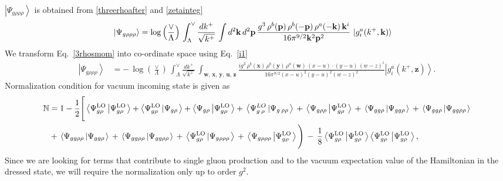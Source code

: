\documentclass[aps,prd,amsmath,amssymb,nofootinbib]{revtex4-2}
\def\mf#1{\mathbb{#1}}
\numberwithin{equation}{section}
\begin{document}
$\left|\Psi_{g\rho\rho\rho}\right\rangle$ is obtained from \eqref{threerhoafter} and \eqref{zetainteg}
\begin{align}\label{3rhosmom}
    \left|\Psi_{g\rho\rho\rho}\right\rangle & = \log{\left(\frac{\vee}{\Lambda}\right)}\,\int_{\Lambda}^{\vee}\frac{dk^{+}}{\sqrt{k^{+}}}\,\int d^{2}\mathbf{k}\, d^{2}\mathbf{p}\,\frac{g^{3}\,\rho^{b}(\mathbf{p})\,\rho^{b}(-\mathbf{p})\,\rho^{a}(-\mathbf{k})\, \mathbf{k}^{i}}{16\pi^{9/2}\mathbf{k}^{2}\mathbf{p}^{2}}\, \ket{g^{a}_{i}(k^{+},\mathbf{k})}
\end{align}
We transform Eq.~\eqref{3rhosmom} into co-ordinate space using Eq.~\eqref{i1}
\begin{align}\label{3rhospos}
 \left|\Psi_{g\rho\rho\rho}\right\rangle & =  -\,\log{\left(\frac{\vee}{\Lambda}\right)}\,\int_{\Lambda}^{\vee}\frac{dk^{+}}{\sqrt{k^{+}}}\,\int_{\mathbf{w},\, \mathbf{x},\, \mathbf{y},\, \mathbf{u},\, \mathbf{z}}\frac{ig^{3}\,\rho^{b}(\mathbf{x})\,\rho^{b}(\mathbf{y})\,\rho^{a}(\mathbf{w})\, (x-u)\cdot (y-u)\,(w-z)^{i}}{16\pi^{9/2}(x-u)^{2}(y-u)^{2}(w-z)^{2}}\left|g_{i}^{a}(k^{+},\mathbf{z})\right\rangle .
\end{align}
Normalization condition for vacuum incoming state is given as
\begin{align}
    \mf{N} & = 1-\frac{1}{2}\Bigg[\left\langle \Psi_{g\rho}^{\text{LO}}\left|\Psi_{g\rho}^{\text{LO}}\right.\right\rangle + \left\langle \Psi_{g\rho}^{\text{LO}}\left|\Psi_{g\rho}\right.\right\rangle +\left\langle \Psi_{g\rho}\left|\Psi_{g\rho}^{\text{LO}}\right.\right\rangle +\,\left\langle \Psi_{g\:\rho}^{LO}\left|\Psi_{g\:\rho\rho}\right.\right\rangle \,+\,\left\langle \Psi_{g\rho\rho}\left|\Psi_{g\rho}^{\text{LO}}\right.\right\rangle \,+\,\left\langle \Psi_{gg\rho}\left|\Psi_{gg\rho}\right.\right\rangle \,+\,\left\langle \Psi_{gg\rho}\left|\Psi_{gg\rho\rho}\right.\right\rangle \notag \\ & +\,\left\langle \Psi_{gg\rho\rho}\left|\Psi_{gg\rho}\right.\right\rangle\,+\,\left\langle \Psi_{gg\rho\rho}\left|\Psi_{gg\rho\rho}\right.\right\rangle \,+\,\left\langle \Psi_{g\rho}^{\text{LO}}\left|\Psi_{g\rho\rho\rho}\right.\right\rangle \,+\,\left\langle \Psi_{g\rho\rho\rho}\left|\Psi_{g\rho}^{\text{LO}}\right.\right\rangle \Bigg)\,-\,\frac{1}{8}\left\langle \Psi_{g\rho}^{\text{LO}}\left|\Psi_{g\rho}^{\text{LO}}\right.\right\rangle \left\langle \Psi_{g\rho}^{\text{LO}}\left|\Psi_{g\rho}^{\text{LO}}\right.\right\rangle,
\end{align}
Since we are looking for terms that contribute to single gluon production and to the vacuum expectation value of the Hamiltonian in the dressed state, we will require the normalization only up to order $g^{2}$.
\end{document}
